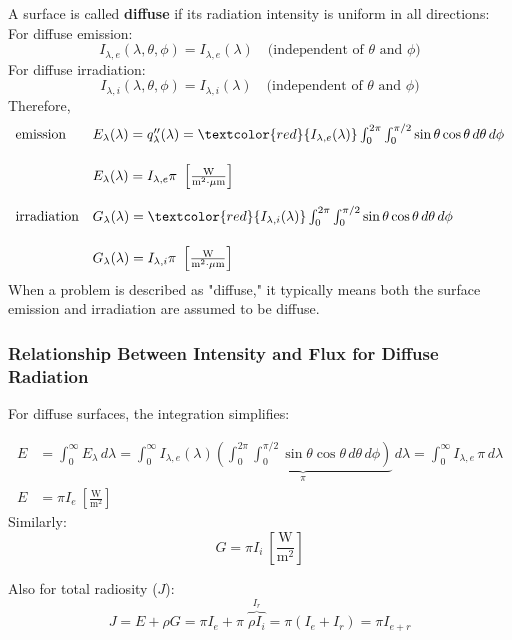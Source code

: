 A surface is called \textbf{diffuse} if its radiation intensity is uniform in all directions:
%
For diffuse emission:
\[
    I_{\lambda,e}(\lambda,\theta,\phi) = I_{\lambda,e}(\lambda) \quad \text{(independent of $\theta$ and $\phi$)}
\]
%
For diffuse irradiation:
\[
    I_{\lambda,i}(\lambda,\theta,\phi) = I_{\lambda,i}(\lambda) \quad \text{(independent of $\theta$ and $\phi$)}
\]
%
Therefore,
%
\[
    \begin{array}{ll}
        \text{emission} &  E_{\lambda}(\lambda) =  q''_{\lambda}(\lambda)= \textcolor{red}{I_{\lambda,e}(\lambda)} \int_0^{2\pi} \int_0^{\pi/2} \sin\theta \cos\theta \, d\theta \, d\phi  
        \\[1.5em]
        &  E_{\lambda}(\lambda) = I_{\lambda,e} \pi \ \left[\frac{\text{W}}{\text{m}^2 \cdot \mu\text{m}}\right]
        \\[1.5em]
        \text{irradiation} & G_{\lambda}(\lambda) = \textcolor{red}{I_{\lambda,i}(\lambda)}\int_0^{2\pi} \int_0^{\pi/2}  \sin\theta \cos\theta \, d\theta \, d\phi
        \\[1.5em]
        & G_{\lambda}(\lambda) = I_{\lambda,i}\pi \ \left[\frac{\text{W}}{\text{m}^2 \cdot \mu\text{m}}\right]
    \end{array}
\]
%
When a problem is described as "diffuse," it typically means both the surface emission and irradiation are assumed to be diffuse.
\subsubsection*{Relationship Between Intensity and Flux for Diffuse Radiation}
For diffuse surfaces, the integration simplifies:

\begin{definition}  
\[
    \begin{aligned}
        E &= \int_0^{\infty} E_{\lambda} \, d\lambda 
           = \int_0^{\infty} I_{\lambda,e}(\lambda) \underbrace{\left(\int_0^{2\pi} \int_0^{\pi/2}  \sin\theta \cos\theta \, d\theta \, d\phi \right) }_{\pi}\, d\lambda  
           = \int_0^{\infty} I_{\lambda,e}\,\pi \, d\lambda
        \\[1em]
        E &= \pi I_e \ \left[\frac{\text{W}}{\text{m}^2}\right]
    \end{aligned}
\]
%
Similarly:
\[
G = \pi I_i \ \left[\frac{\text{W}}{\text{m}^2}\right]
\]

Also for total radiosity ($J$):
\[
    J = E + \rho G = \pi I_e + \pi \;\overbrace{\rho I_i}^{I_r} = \pi (I_e + I_r) = \pi I_{e+r}
\]
\end{definition}
